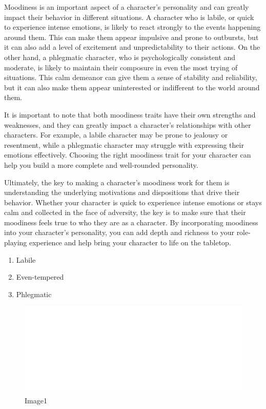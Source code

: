 Moodiness is an important aspect of a character's personality and can
greatly impact their behavior in different situations. A character who
is labile, or quick to experience intense emotions, is likely to react
strongly to the events happening around them. This can make them appear
impulsive and prone to outbursts, but it can also add a level of
excitement and unpredictability to their actions. On the other hand, a
phlegmatic character, who is psychologically consistent and moderate, is
likely to maintain their composure in even the most trying of
situations. This calm demeanor can give them a sense of stability and
reliability, but it can also make them appear uninterested or
indifferent to the world around them.

It is important to note that both moodiness traits have their own
strengths and weaknesses, and they can greatly impact a character's
relationships with other characters. For example, a labile character may
be prone to jealousy or resentment, while a phlegmatic character may
struggle with expressing their emotions effectively. Choosing the right
moodiness trait for your character can help you build a more complete
and well-rounded personality.

Ultimately, the key to making a character's moodiness work for them is
understanding the underlying motivations and dispositions that drive
their behavior. Whether your character is quick to experience intense
emotions or stays calm and collected in the face of adversity, the key
is to make sure that their moodiness feels true to who they are as a
character. By incorporating moodiness into your character's personality,
you can add depth and richness to your role-playing experience and help
bring your character to life on the tabletop.

\begin{enumerate}
\def\labelenumi{\arabic{enumi}.}
\tightlist
\item
  Labile
\item
  Even-tempered
\item
  Phlegmatic
\end{enumerate}

\begin{figure}
\centering
\includegraphics{./images/personality03.svg}
\caption{Image1}
\end{figure}

